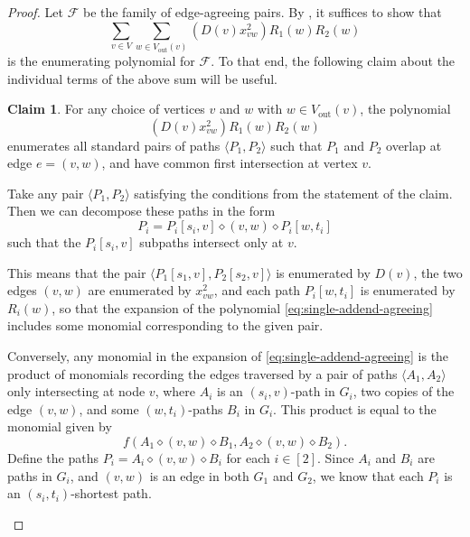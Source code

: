 \documentclass[11pt]{article}
\newcommand{\grp}[1]{\left(#1\right)}
\newcommand{\dia}{\diamond}
\newcommand{\ca}{\mathcal}
\renewcommand{\t}{\text}
\newcommand{\vout}{V_{\t{out}}}
\theoremstyle{definition}
\newtheorem{claim}[theorem]{Claim}
\begin{document}
\begin{proof}
Let $\ca{F}$ be the family of edge-agreeing pairs.
    By , it suffices to show that 
    \[\sum_{v\in V}
        \sum_{w\in \vout(v)} \grp{D(v)x_{vw}^2} R_1(w)R_2(w)\]
    is the enumerating polynomial for $\ca{F}$.
    To that end, the following claim about the individual terms of the above sum will be useful.

    \begin{claim}
        \label{first-edge-overlap}
        For any choice of vertices $v$ and $w$ with $w\in\vout(v)$,
        the polynomial
            \begin{equation}
            \label{eq:single-addend-agreeing}
            \grp{D(v)x_{vw}^2} R_1(w)R_2(w)
            \end{equation}
            enumerates all standard pairs of paths $\langle P_1, P_2\rangle$ such that $P_1$ and $P_2$ overlap at edge $e = (v,w)$, and have common first intersection at vertex $v$.
    \end{claim}
    \begin{claimproof}
       Take any pair $\langle P_1,P_2\rangle$ satisfying the conditions from the statement of the claim.
       Then we can decompose these paths in the form
        \[P_i = P_i[s_i,v]\dia (v,w) \dia P_i[w,t_i]\]
        such that the $P_i[s_i,v]$ subpaths  intersect only at $v$.
        
            This means that the pair $\langle P_1[s_1,v], P_2[s_2,v]\rangle$ is enumerated by $D(v)$, the two edges $(v,w)$ are enumerated by $x_{vw}^2$, and each path $P_i[w,t_i]$ is enumerated by $R_i(w)$, so that the expansion of the polynomial \cref{eq:single-addend-agreeing}
            includes some monomial corresponding to the given pair.

            Conversely, any monomial in the expansion of \cref{eq:single-addend-agreeing} is the product of monomials recording the edges traversed by a pair of paths $\langle A_1, A_2\rangle$ only intersecting at node $v$, where $A_i$ is an $(s_i,v)$-path in $G_i$, two copies of the edge $(v,w)$, and some $(w,t_i)$-paths $B_i$ in $G_i$.
            This product is equal to the monomial given by  
                \[f(A_1\dia (v,w)\dia B_1, A_2\dia (v,w)\dia B_2).\]
            Define the paths $P_i = A_i\dia (v,w)\dia B_i$ for each $i\in [2]$.
            Since $A_i$ and $B_i$ are paths in $G_i$, and $(v,w)$ is an edge in both $G_1$ and $G_2$, we know that each $P_i$ is an $(s_i,t_i)$-shortest path.
                

\end{claimproof}
\end{proof}
\end{document}
